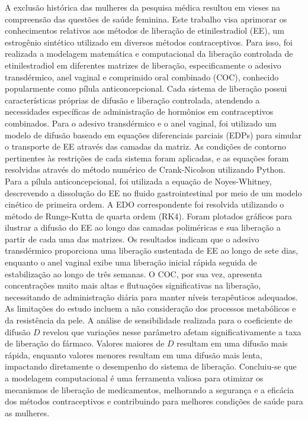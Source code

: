 \begin{resumo}
A exclusão histórica das mulheres da pesquisa médica resultou em vieses na compreensão das questões de saúde feminina. Este trabalho visa aprimorar os conhecimentos relativos aos métodos de liberação de etinilestradiol (EE), um estrogênio sintético utilizado em diversos métodos contraceptivos. Para isso, foi realizada a modelagem matemática e computacional da liberação controlada de etinilestradiol em diferentes matrizes de liberação, especificamente o adesivo transdérmico, anel vaginal e comprimido oral combinado (COC), conhecido popularmente como pílula anticoncepcional. Cada sistema de liberação possui características próprias de difusão e liberação controlada, atendendo a necessidades específicas de administração de hormônios em contraceptivos combinados. Para o adesivo transdérmico e o anel vaginal, foi utilizado um modelo de difusão baseado em equações diferenciais parciais (EDPs) para simular o transporte de EE através das camadas da matriz. As condições de contorno pertinentes às restrições de cada sistema foram aplicadas, e as equações foram resolvidas através do método numérico de Crank-Nicolson utilizando Python. Para a pílula anticoncepcional, foi utilizada a equação de Noyes-Whitney, descrevendo a dissolução do EE no fluido gastrointestinal por meio de um modelo cinético de primeira ordem. A EDO correspondente foi resolvida utilizando o método de Runge-Kutta de quarta ordem (RK4). Foram plotados gráficos para ilustrar a difusão do EE ao longo das camadas poliméricas e sua liberação a partir de cada uma das matrizes. Os resultados indicam que o adesivo transdérmico proporciona uma liberação sustentada de EE ao longo de sete dias, enquanto o anel vaginal exibe uma liberação inicial rápida seguida de estabilização ao longo de três semanas. O COC, por sua vez, apresenta concentrações muito mais altas e flutuações significativas na liberação, necessitando de administração diária para manter níveis terapêuticos adequados. As limitações do estudo incluem a não consideração dos processos metabólicos e da resistência da pele. A análise de sensibilidade realizada para o coeficiente de difusão \( D \) revelou que variações nesse parâmetro afetam significativamente a taxa de liberação do fármaco. Valores maiores de \( D \) resultam em uma difusão mais rápida, enquanto valores menores resultam em uma difusão mais lenta, impactando diretamente o desempenho do sistema de liberação. Concluiu-se que a modelagem computacional é uma ferramenta valiosa para otimizar os mecanismos de liberação de medicamentos, melhorando a segurança e a eficácia dos métodos contraceptivos e contribuindo para melhores condições de saúde para as mulheres.
\end{resumo}